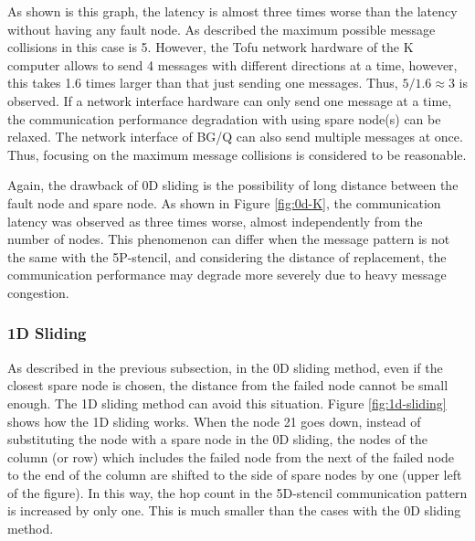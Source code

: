 \documentclass[10pt,conference,a4paper,fleqn]{IEEEtran}
\begin{document}
As shown is this graph, the latency is almost three times worse than
the latency without having any fault node. As described the maximum
possible message collisions in this case is 5. However, the Tofu
network hardware of the K computer allows to send 4 messages with 
different directions at a time, however, this takes 1.6 times larger
than that just sending one
messages\cite{shida2012:mpi_kcomputer}. Thus, $5 / 1.6 \approx 3$ is 
observed. If a network interface hardware can only send one message at
a time, the communication performance degradation with using spare
node(s) can be relaxed. The network interface of BG/Q can also send
multiple messages at once\cite{Chen:2011:IBG:2063384.2063419}. Thus,
focusing on the maximum message collisions is considered to be
reasonable.


Again, the drawback of 0D sliding is the possibility of long distance
between the fault node and spare node. As shown in Figure
\ref{fig:0d-K}, the communication latency was observed as three times
worse, almost independently from the number of nodes. This phenomenon can
differ when the message pattern is not the same with the 5P-stencil,
and considering the distance of replacement, the communication
performance may degrade more severely due to heavy message congestion. 

\subsubsection{1D Sliding}

As described in the previous subsection, in the 0D sliding method,
even if the closest spare node is chosen, 
the distance from the failed node cannot be small enough. The 1D sliding
method can avoid this situation. Figure \ref{fig:1d-sliding} shows how
the 1D sliding works. When the node 21 goes down, instead of substituting
the node with a spare node in the 0D sliding, the nodes of the column (or
row) which includes the failed node from the next of the failed node
to the end of the column are shifted to the side of spare nodes by one
(upper left of the figure). In this way, the hop count in the
5D-stencil communication pattern is increased by only one. This is much
smaller than the cases with the 0D sliding method. 
\end{document}

